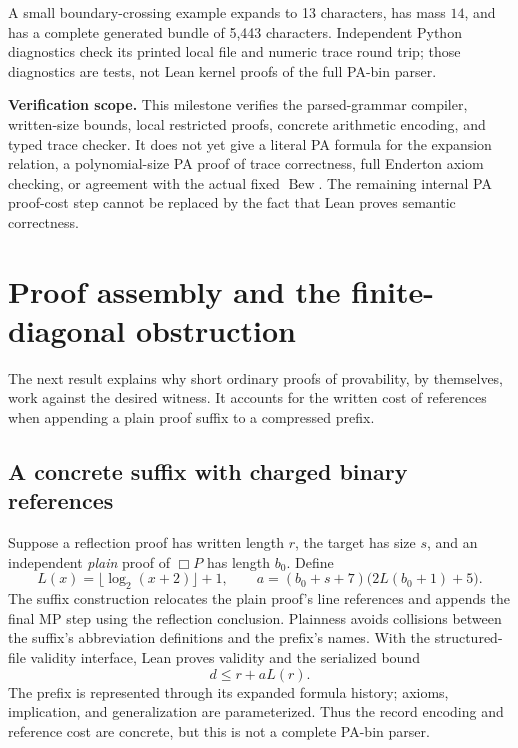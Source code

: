 \documentclass[11pt]{article}
\theoremstyle{definition}
\theoremstyle{remark}
\newcommand{\status}[1]{\par\smallskip\noindent\textbf{Verification scope.} #1\par\smallskip}
\begin{document}
A small boundary-crossing example expands to 13 characters, has mass $14$,
and has a complete generated bundle of 5,443 characters. Independent Python
diagnostics check its printed local file and numeric trace round trip; those
diagnostics are tests, not Lean kernel proofs of the full PA-bin parser.

\status{This milestone verifies the parsed-grammar compiler, written-size
bounds, local restricted proofs, concrete arithmetic encoding, and typed trace
checker. It does not yet give a literal PA formula for the expansion relation,
a polynomial-size PA proof of trace correctness, full Enderton axiom checking,
or agreement with the actual fixed $\operatorname{Bew}$. The remaining internal
PA proof-cost step cannot be replaced by the fact that Lean proves semantic
correctness.}

\section{Proof assembly and the finite-diagonal obstruction}
\label{sec:obstruction}

The next result explains why short ordinary proofs of provability, by
themselves, work against the desired witness. It accounts for the written cost
of references when appending a plain proof suffix to a compressed prefix.

\subsection{A concrete suffix with charged binary references}
Suppose a reflection proof has written length $r$, the target has size $s$,
and an independent \emph{plain} proof of $\Box P$ has length $b_0$. Define
\[
 L(x)=\lfloor\log_2(x+2)\rfloor+1,\qquad
 a=(b_0+s+7)\bigl(2L(b_0+1)+5\bigr).
\]
The suffix construction relocates the plain proof's line references and
appends the final MP step using the reflection conclusion. Plainness avoids
collisions between the suffix's abbreviation definitions and the prefix's
names. With the structured-file validity interface, Lean proves validity and
the serialized bound
\begin{equation}\label{eq:assembly}
 d\le r+aL(r).
\end{equation}
The prefix is represented through its expanded formula history; axioms,
implication, and generalization are parameterized. Thus the record encoding
and reference cost are concrete, but this is not a complete PA-bin parser.
\end{document}
